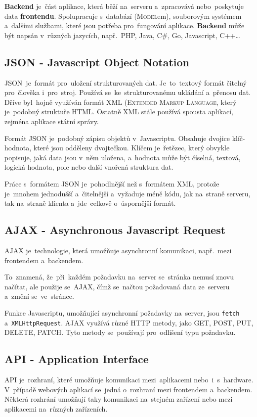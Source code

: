 \documentclass[14pt,a4paper]{article}
\begin{document}
        \textbf{Backend} je~část aplikace, která běží na~serveru a~zpracovává nebo~poskytuje data \textbf{frontendu}. Spolupracuje s~databází (\textsc{Model}em), souborovým systémem a~dalšími službami, které jsou potřeba pro~fungování aplikace. \textbf{Backend} může být napsán v~různých jazycích, např.~PHP, Java, C\#, Go, Javascript, C++\dots

        \subsection{JSON - Javascript Object Notation}
        \textsc{JSON}~je~formát pro~uložení strukturovaných dat. Je~to~textový formát čitelný pro~člověka i~pro~stroj. Používá se~ke~strukturovanému ukládání a~přenosu dat. Dříve byl~hojně využíván formát \textsc{XML} (\textsc{Extended Markup Language}, který je~podobný struktuře \textsc{HTML}. Ostatně \textsc{XML} stále používá spousta aplikací, zejména aplikace státní správy.

        Formát \textsc{JSON} je~podobný zápisu objektů v~Javascriptu. Obsahuje dvojice klíč-hodnota, které jsou odděleny dvojtečkou. Klíčem je~řetězec, který obvykle popisuje, jaká data jsou v~něm uložena, a~hodnota může být číselná, textová, logická hodnota, pole nebo další vnořená struktura dat.
        
        Práce s~formátem \textsc{JSON} je~pohodlnější než s~formátem XML, protože je~mnohem jednodušší a~čitelnější a~vyžaduje méně kódu, jak na~straně serveru, tak na~straně klienta a~jde~celkově o~úspornější formát.

        \subsection{AJAX - Asynchronous Javascript Request}
        \textsc{AJAX} je~technologie, která umožňuje asynchronní komunikaci, např.~mezi frontendem a~backendem.

        To~znamená, že~při~každém požadavku na~server se~stránka nemusí znovu načítat, ale použije se~\textsc{AJAX}, čímž se~načtou požadovaná data ze~serveru a~změní se~ve~stránce.

        Funkce Javascriptu, umožňující asynchronní požadavky na~server, jsou \texttt{fetch} a~\texttt{XMLHttpRequest}. AJAX využívá různé HTTP metody, jako GET, POST, PUT, DELETE, PATCH. Tyto metody se~používají pro~odlišení typu požadavku.\parencite{ajax:mdn}

        \subsection{API - Application Interface}
        \textsc{API} je~rozhraní, které umožňuje komunikaci mezi~aplikacemi nebo~i~s~hardware. V~případě webových aplikací se~jedná o~rozhraní mezi frontendem a~backendem. Některá rozhrání umožňují taky komunikaci na~stejném zařízení nebo mezi aplikacemi na~různých zařízeních.
        
\end{document}
